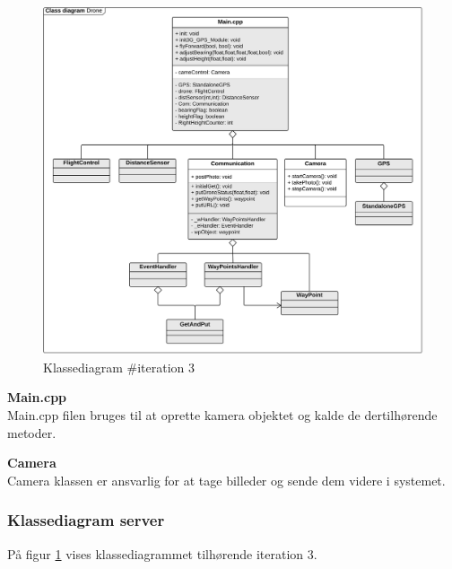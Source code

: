\begin{figure}[H]
	\centering
	\includegraphics[width=1\textwidth]{Billeder/klasse_diagrammer/classdiagram_iteration3_drone.png}
	\vspace{-0.5cm}
	\caption{Klassediagram \#iteration 3}
	\label{fig:classDiagram_iteration3}
\end{figure}

\textbf{Main.cpp} \\
Main.cpp filen bruges til at oprette kamera objektet og kalde de dertilhørende metoder.

\textbf{Camera} \\
Camera klassen er ansvarlig for at tage billeder og sende dem videre i systemet. 
\newpage

\subsubsection*{Klassediagram server}

På figur \ref{fig:classDiagram_iteration3} vises klassediagrammet tilhørende iteration 3. 

